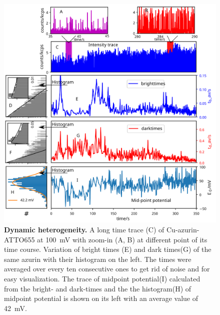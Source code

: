 \begin{figure}
	\centering
	\includegraphics[width=\textwidth]{long_azurin_trace}
	\caption{\textbf{Dynamic heterogeneity.}
	A long time trace (C) of Cu-azurin-ATTO655 at \SI{100}{\mV} with zoom-in (A, B) at different point of its time course.
	Variation of bright times (E) and dark times(G) of the same azurin with their histogram on the left.
	The times were averaged over every ten consecutive ones to get rid of noise and for easy visualization.
	The trace of midpoint potential(I) calculated from the bright- and dark-times and the the histogram(H) of midpoint potential is shown on its left with an average value of \SI{42}{\mV}.
	}
	\label{fig:long_azurin_trace}
\end{figure}



